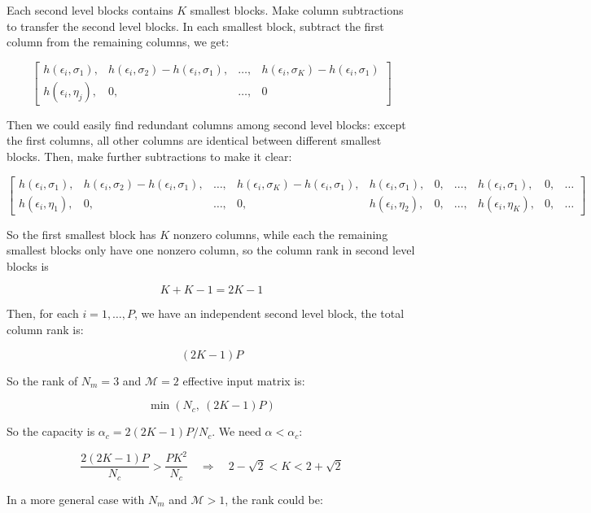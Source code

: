 \documentclass[conference]{acmsiggraph}
\begin{document}
Each second level blocks contains $K$ smallest blocks. Make column subtractions to transfer the second level blocks. In each smallest block, subtract the first column from the remaining columns, we get:

\begin{equation}
\begin{bmatrix}
h(\epsilon_i,\sigma_1), & h(\epsilon_i,\sigma_2) -h(\epsilon_i,\sigma_1) ,& \dots, & h(\epsilon_i,\sigma_K) - h(\epsilon_i,\sigma_1)  \\
h(\epsilon_i,\eta_j),&0,& \dots, &0
\end{bmatrix}
\end{equation}

Then we could easily find redundant columns among second level blocks: except the first columns, all other columns are identical between different smallest blocks. Then, make further subtractions to make it clear:

\begin{equation}
\begin{bmatrix}
h(\epsilon_i,\sigma_1), & h(\epsilon_i,\sigma_2) -h(\epsilon_i,\sigma_1) ,& \dots, & h(\epsilon_i,\sigma_K) - h(\epsilon_i,\sigma_1),&h(\epsilon_i,\sigma_1), &0,&\dots, &h(\epsilon_i,\sigma_1),&0,&\dots \\
h(\epsilon_i,\eta_1),&0,& \dots, &0, &h(\epsilon_i,\eta_2),&0,&\dots,&h(\epsilon_i,\eta_K),&0,&\dots
\end{bmatrix}
\end{equation}


So the first smallest block has $K$ nonzero columns, while each the remaining smallest blocks only have one nonzero column, so the column rank in second level blocks is 

\begin{equation}
    K + K - 1 = 2K - 1 
\end{equation}

Then, for each $i = 1,\dots,P$, we have an independent second level block, the total column rank is:

\begin{equation}
    (2K-1)P
\end{equation}

So the rank of $N_m = 3$ and $\mathcal{M}= 2$ effective input matrix is:

\begin{equation}
    \min{\left(N_c,\ (2K-1)P\right)}
\end{equation}

So the capacity is $\alpha_c = 2(2K-1)P/N_c$. We need $\alpha < \alpha_c$:

\begin{equation}
    \frac{2(2K-1)P}{N_c} > \frac{PK^2}{N_c}  \quad \Rightarrow \quad 2- \sqrt{2}< K < 2+ \sqrt{2}
\end{equation}

In a more general case with $N_m$ and $\mathcal{M}>1$, the rank could be:
\end{document}
